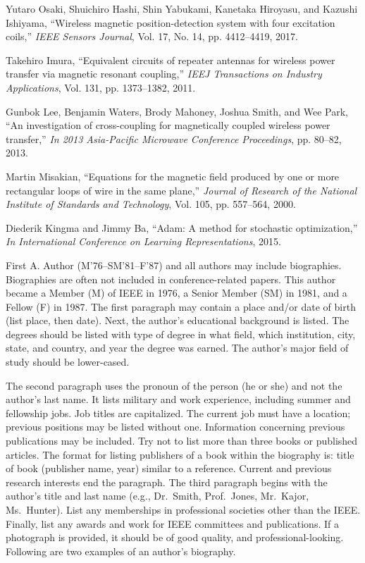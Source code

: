 \documentclass[journal,twoside,web]{ieeecolor}
\begin{document}
\begin{thebibliography}{00}
 Yutaro Osaki, Shuichiro Hashi, Shin Yabukami, Kanetaka Hiroyasu, and Kazushi Ishiyama, ``Wireless magnetic position-detection
system with four excitation coils,'' \emph{IEEE Sensors Journal}, Vol. 17,
No. 14, pp. 4412–4419, 2017.

 Takehiro Imura, ``Equivalent circuits of repeater antennas for wireless power transfer via magnetic resonant coupling,'' \emph{IEEJ Transactions on Industry Applications}, Vol. 131, pp. 1373–1382, 2011.

 Gunbok Lee, Benjamin Waters, Brody Mahoney, Joshua Smith,
and Wee Park, ``An investigation of cross-coupling for magnetically
coupled wireless power transfer,'' \emph{ In 2013 Asia-Pacific Microwave
Conference Proceedings},  pp. 80–82, 2013.

 Martin Misakian, ``Equations for the magnetic field produced by
one or more rectangular loops of wire in the same plane,'' \emph{Journal
of Research of the National Institute of Standards and Technology},  Vol. 105, pp. 557–564, 2000.

 Diederik Kingma and Jimmy Ba, ``Adam: A method for stochastic
optimization,'' \emph{ In International Conference on Learning Representations}, 2015.

\end{thebibliography}

\begin{IEEEbiography}{First A. Author} (M'76--SM'81--F'87) and all authors may include 
biographies. Biographies are often not included in conference-related
papers. This author became a Member (M) of IEEE in 1976, a Senior
Member (SM) in 1981, and a Fellow (F) in 1987. The first paragraph may
contain a place and/or date of birth (list place, then date). Next,
the author's educational background is listed. The degrees should be
listed with type of degree in what field, which institution, city,
state, and country, and year the degree was earned. The author's major
field of study should be lower-cased. 

The second paragraph uses the pronoun of the person (he or she) and not the 
author's last name. It lists military and work experience, including summer 
and fellowship jobs. Job titles are capitalized. The current job must have a 
location; previous positions may be listed 
without one. Information concerning previous publications may be included. 
Try not to list more than three books or published articles. The format for 
listing publishers of a book within the biography is: title of book 
(publisher name, year) similar to a reference. Current and previous research 
interests end the paragraph. The third paragraph begins with the author's 
title and last name (e.g., Dr.\ Smith, Prof.\ Jones, Mr.\ Kajor, Ms.\ Hunter). 
List any memberships in professional societies other than the IEEE. Finally, 
list any awards and work for IEEE committees and publications. If a 
photograph is provided, it should be of good quality, and 
professional-looking. Following are two examples of an author's biography.
\end{IEEEbiography}
\end{document}
